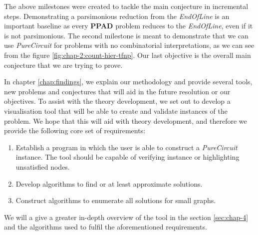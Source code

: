 \sloppy
The above milestones were created to tackle the main conjecture in incremental steps.
Demon\-strat\-ing a parsimonious reduction from the \textit{EndOfLine} is an important baseline
as every \textbf{PPAD} problem reduces to the \textit{EndOfLine}, even if it is not parsimonious.
The second milestone is meant to demonstrate that we can use \textit{PureCircuit} for
problems with no combinatorial interpretations, as we can see from the figure
\ref{fig:chap-2:count-hier-tfnp}. Our last objective is the overall
main conjecture that we are trying to prove.

In chapter \ref{chap:findings}, we explain our methodology and provide several tools, new problems and
conjectures that  will aid in the future resolution or our objectives.
To assist with the theory development, we set out to develop a visualisation tool that will be able
to create and validate instances of the problem. We hope that this
will aid with theory development, and therefore we provide the following
core set of requirements:
\begin{enumerate}
    \item Establish a program in which the user is able to construct a \textit{PureCircuit} instance.
          The tool should be capable of verifying instance
          or highlighting unsatisfied nodes.
    \item Develop algorithms to find or at least approximate solutions.
    \item Construct algorithms to enumerate all solutions for small graphs.
\end{enumerate}

We will a give a greater in-depth overview of the tool in the section \ref{sec:chap-4}
and the algorithms used to fulfil the aforementioned requirements.

